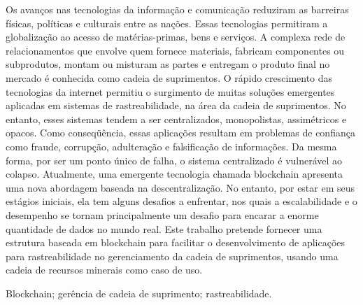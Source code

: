 
\resumo
Os avanços nas tecnologias da informação e comunicação reduziram as barreiras físicas, políticas e culturais entre as nações. Essas tecnologias permitiram a globalização ao acesso de matérias-primas, bens e serviços. A complexa rede de relacionamentos que envolve quem fornece materiais, fabricam componentes ou subprodutos, montam ou misturam as partes e entregam o produto final no mercado é conhecida como cadeia de suprimentos. O rápido crescimento das tecnologias da internet permitiu o surgimento de muitas soluções emergentes aplicadas em sistemas de rastreabilidade, na área da cadeia de suprimentos. No entanto, esses sistemas tendem a ser centralizados, monopolistas, assimétricos e opacos. Como conseqüência, essas aplicações resultam em problemas de confiança como fraude, corrupção, adulteração e falsificação de informações. Da mesma forma, por ser um ponto único de falha, o sistema centralizado é vulnerável ao colapso. Atualmente, uma emergente tecnologia chamada blockchain apresenta uma nova abordagem baseada na descentralização. No entanto, por estar em seus estágios iniciais, ela tem alguns desafios a enfrentar, nos quais a escalabilidade e o desempenho se tornam principalmente um desafio para encarar a enorme quantidade de dados no mundo real. Este trabalho pretende fornecer uma estrutura baseada em blockchain para facilitar o desenvolvimento de aplicações para rastreabilidade no gerenciamento da cadeia de suprimentos, usando uma cadeia de recursos minerais como caso de uso.


\begin{keywords}
Blockchain; gerência de cadeia de suprimento; rastreabilidade.
\end{keywords}


